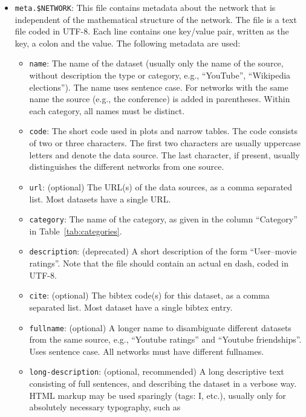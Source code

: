 \documentclass{article}
\begin{document}
\begin{itemize}
  \item \texttt{meta.\$NETWORK}: This file contains metadata about the
    network that is independent of the mathematical structure of the
    network.  The file is a text file coded in UTF-8.  Each line
    contains one key/value pair, written as the key, a colon and the
    value.  The following metadata are used:
    \begin{itemize}
      \item \texttt{name}: The name of the dataset (usually only the
        name of the source, without description the type or category,
        e.g., ``YouTube'', ``Wikipedia elections'').  The name uses
        sentence case. For networks with the same name the source (e.g.,
        the conference) is added in parentheses.  Within each category,
        all names must be distinct.
      \item \texttt{code}: The short code used in plots and narrow
        tables. The code consists of two or three characters.  The first
        two characters are usually uppercase letters and denote the data
        source.  The last character, if present, usually distinguishes
        the different networks from one source.
      \item \texttt{url}: (optional) The URL(s) of the data sources, as a comma
        separated list.  Most datasets have a single URL.
      \item \texttt{category}: The name of the category, as given in the
        column ``Category'' in Table~\ref{tab:categories}.
      \item \texttt{description}: (deprecated) A short description of the form
        ``User–movie ratings''.  Note that the file should contain an
        actual en dash, coded in UTF-8.
      \item \texttt{cite}: (optional) The bibtex code(s) for this dataset, as a
        comma separated list. Most dataset have a single bibtex entry.
      \item \texttt{fullname}: (optional) A longer name to disambiguate
        different datasets from the same source, e.g., ``Youtube
        ratings'' and ``Youtube friendships''.  Uses sentence case.  All
        networks must have different fullnames.
      \item \texttt{long-description}: (optional, recommended) A long descriptive
        text consisting of full sentences, and describing the dataset in
        a verbose way.  HTML markup may be used sparingly (tags: I,
        etc.), usually only for absolutely necessary typography, such as

\end{itemize}
\end{itemize}
\end{document}
